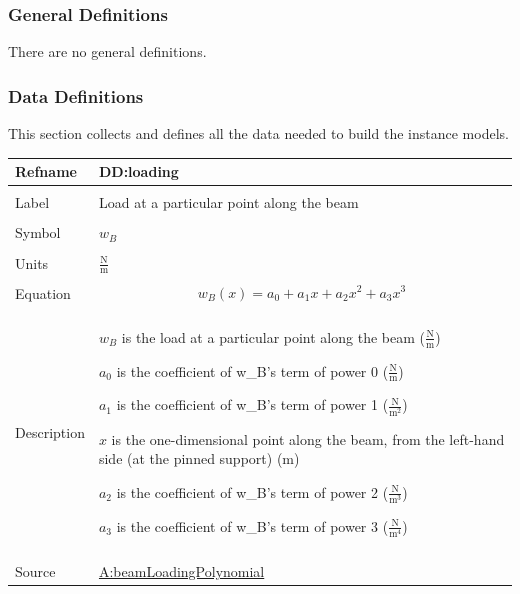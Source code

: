 \documentclass[12pt]{article}
\begin{document}
\subsubsection{General Definitions}
\label{Sec:GDs}
There are no general definitions.

\subsubsection{Data Definitions}
\label{Sec:DDs}
This section collects and defines all the data needed to build the instance models.

\vspace{\baselineskip}
\noindent
\begin{minipage}{\textwidth}
\begin{tabular}{>{\raggedright}p{}>{\raggedright\arraybackslash}p{}}
\toprule \textbf{Refname} & \textbf{DD:loading}
\label{DD:loading}
\\ \midrule \\
Label & Load at a particular point along the beam
        
\\ \midrule \\
Symbol & ${w_{B}}$
         
\\ \midrule \\
Units & $\frac{\text{N}}{\text{m}}$
        
\\ \midrule \\
Equation & \begin{displaymath}
           {w_{B}}\left(x\right)={a_{\text{0}}}+{a_{\text{1}}} x+{a_{\text{2}}} x^{2}+{a_{\text{3}}} x^{3}
           \end{displaymath}
\\ \midrule \\
Description & \begin{symbDescription}
              \item{${w_{B}}$ is the load at a particular point along the beam ($\frac{\text{N}}{\text{m}}$)}
              \item{${a_{\text{0}}}$ is the coefficient of w\_B's term of power 0 ($\frac{\text{N}}{\text{m}}$)}
              \item{${a_{\text{1}}}$ is the coefficient of w\_B's term of power 1 ($\frac{\text{N}}{\text{m}^{2}}$)}
              \item{$x$ is the one-dimensional point along the beam, from the left-hand side (at the pinned support) (${\text{m}}$)}
              \item{${a_{\text{2}}}$ is the coefficient of w\_B's term of power 2 ($\frac{\text{N}}{\text{m}^{3}}$)}
              \item{${a_{\text{3}}}$ is the coefficient of w\_B's term of power 3 ($\frac{\text{N}}{\text{m}^{4}}$)}
              \end{symbDescription}
\\ \midrule \\
Source & \hyperref[beamLoadingPolynomial]{A:beamLoadingPolynomial}
         

\end{tabular}
\end{minipage}
\end{document}

